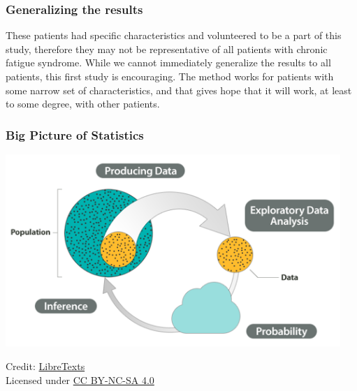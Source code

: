 \documentclass[slidestop,compress,mathserif]{beamer}
\begin{document}
\begin{frame}
\frametitle{Generalizing the results}



These patients had specific characteristics and volunteered to be a part of this study, therefore they may not be representative of all patients with chronic fatigue syndrome. While we cannot immediately generalize the results to all patients, this first study is encouraging. The method works for patients with some narrow set of characteristics, and that gives hope that it will work, at least to some degree, with other patients.


\end{frame}


\begin{frame}
    \frametitle{Big Picture of Statistics}
    \begin{center}
        \includegraphics[width=0.95\textwidth]{figures/BigPicture1.png}
    \end{center}
    \vspace{0.5em}
    \footnotesize
    Credit: \href{https://stats.libretexts.org/Bookshelves/Applied_Statistics/Biostatistics_-_Open_Learning_Textbook/Preliminaries/The_Big_Picture}{LibreTexts}
    \\
    Licensed under \href{https://creativecommons.org/licenses/by-nc-sa/4.0/}{CC BY-NC-SA 4.0}
\end{frame}
\end{document}
